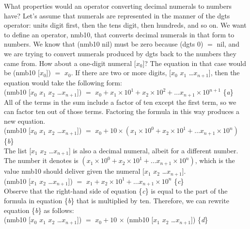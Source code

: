 What properties would an operator
converting decimal numerals to numbers have?
Let's assume that numerals are represented
in the manner of the \textsf{dgts} operator:
units digit first,
then the tens digit, then hundreds, and so on.
We want to define an operator, \textsf{nmb10},
that converts decimal numerals in that form to numbers.
We know that \textsf{(nmb10 nil)} must be zero
because \textsf{(dgts 0)} $=$ \textsf{nil},
and we are trying to convert numerals produced by \textsf{dgts}
back to the numbers they came from.
How about a one-digit numeral \textsf{[$x_0$]}?
The equation in that case would be \textsf{(nmb10 [$x_0$])} $=$ $x_0$.
If there are two or more digits,
\textsf{[$x_0$ $x_1$ \dots $x_{n+1}$]},
then the equation would take the following form:\\
\hspace*{1cm}
\textsf{(nmb10 [$x_0$ $x_1$ $x_2$ \dots $x_{n+1}$])} $=$
$x_0 + x_1 \times 10^1 + x_2 \times 10^2 + \dots x_{n+1} \times 10^{n+1}$ \hfill \{\emph{a}\}\\

\vspace{-1mm}  %
All of the terms in the sum
include a factor of ten except the first term,
so we can factor ten out of those terms.
Factoring the formula in this way produces a new equation.\\
\hspace*{1cm}
\textsf{(nmb10 [$x_0$ $x_1$ $x_2$ \dots $x_{n+1}$])} $=$
$x_0 + 10 \times (x_1 \times 10^0 + x_2 \times 10^1 + \dots x_{n+1} \times 10^n)$ \hfill \{\emph{b}\}\\

\vspace{-1mm}   %
The list \textsf{[$x_1$ $x_2$ \dots $x_{n+1}$]} is also a decimal numeral,
albeit for a different number.
The number it denotes is
$(x_1 \times 10^0 + x_2 \times 10^1 + \dots x_{n+1} \times 10^n)$,
which is the value \textsf{nmb10} should deliver given the numeral \textsf{[$x_1$ $x_2$ \dots $x_{n+1}$]}.\\
\hspace*{1cm}
\textsf{(nmb10 [$x_1$ $x_2$ \dots $x_{n+1}$])} $=$ $x_1 + x_2 \times 10^1 + \dots x_{n+1} \times 10^n$ \hfill \{\emph{c}\}\\

\vspace{-1mm}   %
Observe that the right-hand side of equation \{\emph{c}\}
is equal
to the part of the formula in equation \{\emph{b}\} that is multiplied by ten.
Therefore, we can rewrite equation \{\emph{b}\} as follows:\\
\hspace*{1cm}
\textsf{(nmb10 [$x_0$ $x_1$ $x_2$ \dots $x_{n+1}$])} $=$
$x_0 + 10$ $\times$ \textsf{(nmb10 [$x_1$ $x_2$ \dots $x_{n+1}$])} \hfill \{\emph{d}\}\\

